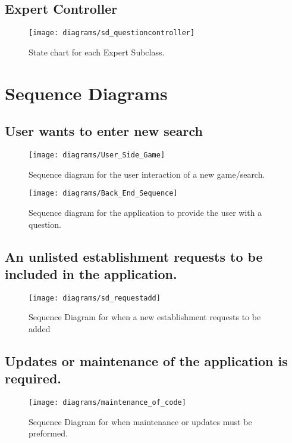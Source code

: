 \documentclass[titlepage]{article}
\begin{document}
\subsection{Expert Controller}
\begin{figure}[H]
\texttt{[image: diagrams/sd\_questioncontroller]}
\caption{State chart for each Expert Subclass.}\label{sc:Experts}
\end{figure}

\section{Sequence Diagrams}
\label{sec:sequence_diagrams}

\subsection{User wants to enter new search}

\begin{figure}[H]
\texttt{[image: diagrams/User\_Side\_Game]}
\caption{Sequence diagram for the user interaction of a new game/search.}\label{sd:front_main}
\end{figure}

\begin{figure}[H]
\texttt{[image: diagrams/Back\_End\_Sequence]}
\caption{Sequence diagram for the application to provide the user with a question.}\label{sd:back_main}
\end{figure}

\subsection{An unlisted establishment requests to be included in the application.}

\begin{figure}[H]
\texttt{[image: diagrams/sd\_requestadd]}
\caption{Sequence Diagram for when a new establishment requests to be added}\label{sd:request_add}
\end{figure}


\subsection{Updates or maintenance of the application is required.}
\begin{figure}[H]
\texttt{[image: diagrams/maintenance\_of\_code]}
\caption{Sequence Diagram for when maintenance or updates must be preformed.}\label{sd:maintenance_of_code}
\end{figure}
\end{document}
